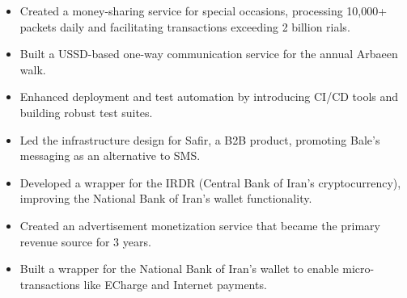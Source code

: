 \documentclass[a4paper]{article}
\begin{document}
\begin{minipage}[t]{0.65\textwidth}
{\begin{itemize}[leftmargin=.5cm, itemsep=1pt]
\begin{small}
            \begin{itemize}[leftmargin=.5cm, itemsep=1pt]
                \item
                    \begin{justifying}\small 
                        Created a money-sharing service for special occasions, processing 10,000+ packets daily and facilitating transactions exceeding 2 billion rials.
                    \end{justifying}
                \item
                    \begin{justifying}\small 
                        Built a USSD-based one-way communication service for the annual Arbaeen walk.
                    \end{justifying}
                \item
                    \begin{justifying}\small 
                        Enhanced deployment and test automation by introducing CI/CD tools and building robust test suites.
                    \end{justifying}
                \item
                    \begin{justifying}\small 
                        Led the infrastructure design for Saﬁr, a B2B product, promoting Bale's messaging as an alternative to SMS.
                    \end{justifying}
                \item
                    \begin{justifying}\small 
                        Developed a wrapper for the IRDR (Central Bank of Iran's cryptocurrency), improving the National Bank of Iran’s wallet functionality.
                    \end{justifying}
                \item
                    \begin{justifying}\small 
                        Created an advertisement monetization service that became the primary revenue source for 3 years.
                    \end{justifying}
                \item
                    \begin{justifying}\small 
                        Built a wrapper for the National Bank of Iran’s wallet to enable micro-transactions like ECharge and Internet payments.
                    \end{justifying}
            \end{itemize}
            \end{small}
  \end{itemize}

}
\end{minipage}
\end{document}
